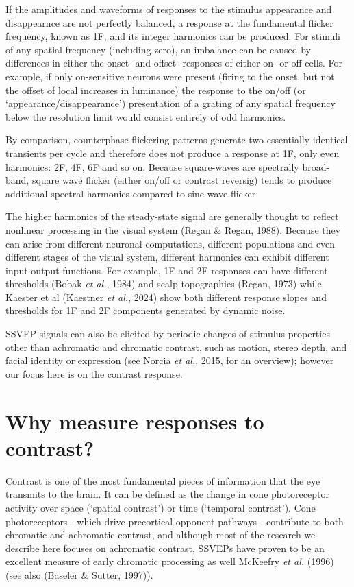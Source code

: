 \documentclass[
  letterpaper,
  DIV=11,
  numbers=noendperiod]{scrartcl}
\begin{document}
If the amplitudes and waveforms of responses to the stimulus appearance
and disappearnce are not perfectly balanced, a response at the
fundamental flicker frequency, known as 1F, and its integer harmonics
can be produced. For stimuli of any spatial frequency (including zero),
an imbalance can be caused by differences in either the onset- and
offset- responses of either on- or off-cells. For example, if only
on-sensitive neurons were present (firing to the onset, but not the
offset of local increases in luminance) the response to the on/off (or
`appearance/disappearance') presentation of a grating of any spatial
frequency below the resolution limit would consist entirely of odd
harmonics.

By comparison, counterphase flickering patterns generate two essentially
identical transients per cycle and therefore does not produce a response
at 1F, only even harmonics: 2F, 4F, 6F and so on. Because square-waves
are spectrally broad-band, square wave flicker (either on/off or
contrast reversig) tends to produce additional spectral harmonics
compared to sine-wave flicker.

The higher harmonics of the steady-state signal are generally thought to
reflect nonlinear processing in the visual system (Regan \& Regan,
1988). Because they can arise from different neuronal computations,
different populations and even different stages of the visual system,
different harmonics can exhibit different input-output functions. For
example, 1F and 2F responses can have different thresholds (Bobak
\emph{et al.}, 1984) and scalp topographies (Regan, 1973) while Kaester
et al (Kaestner \emph{et al.}, 2024) show both different response slopes
and thresholds for 1F and 2F components generated by dynamic noise.

SSVEP signals can also be elicited by periodic changes of stimulus
properties other than achromatic and chromatic contrast, such as motion,
stereo depth, and facial identity or expression (see Norcia \emph{et
al.}, 2015, for an overview); however our focus here is on the contrast
response.

\section{Why measure responses to
contrast?}\label{why-measure-responses-to-contrast}

Contrast is one of the most fundamental pieces of information that the
eye transmits to the brain. It can be defined as the change in cone
photoreceptor activity over space (`spatial contrast') or time
(`temporal contrast'). Cone photoreceptors - which drive precortical
opponent pathways - contribute to both chromatic and achromatic
contrast, and although most of the research we describe here focuses on
achromatic contrast, SSVEPs have proven to be an excellent measure of
early chromatic processing as well McKeefry \emph{et al.} (1996) (see
also (Baseler \& Sutter, 1997)).
\end{document}
